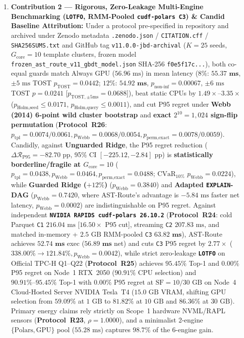 \documentclass[10pt,a4paper]{article}
\begin{document}
\begin{enumerate}[leftmargin=1.5em,itemsep=1.5pt]
    \item \textbf{Contribution 2 --- Rigorous, Zero-Leakage Multi-Engine Benchmarking (\texttt{LOTFO}, RMM-Pooled \texttt{cudf-polars C3}) \& Candid Baseline Attribution:} Under a protocol pre-specified in repository and archived under Zenodo metadata \texttt{.zenodo.json} / \texttt{CITATION.cff} / \texttt{SHA256SUMS.txt} and GitHub tag \texttt{v11.0.0-jbd-archival} ($K=25$ seeds, $G_{\text{core}}=10$ template clusters, frozen model \texttt{frozen\_ast\_route\_v11\_gbdt\_model.json} SHA-256 \texttt{f0e5f17c...}), both co-equal guards match Always GPU ($56.96\text{ ms}$) in mean latency ($8\%$: $\mathbf{55.37\text{ ms}}$, $\pm 5\text{ ms}$ TOST $p_{\text{TOST}}=0.0442$; $12\%$: $\mathbf{54.92\text{ ms}}$, $p_{\text{non-inf}}=0.00067$, $\pm 6\text{ ms}$ TOST $p=0.0241$ [$p_{\text{TOST},\pm 5\text{ms}}=0.0688$]), beat static CPUs by $1.49\times\text{--}3.35\times$ ($p_{\text{Holm,seed}}\le 0.0171$, $p_{\text{Holm,query}}\le 0.0011$), and cut P95 regret under \textbf{Webb (2014) 6-point wild cluster bootstrap} and \textbf{exact $2^{10}=1{,}024$ sign-flip permutation} (\textbf{Protocol~R26}: $p_{\text{tpl}}=0.0074/0.0061, p_{\text{Webb}}=0.0068/0.0054, p_{\text{perm,exact}}=0.0078/0.0059$). Candidly, against \textbf{Unguarded Ridge}, the P95 regret reduction ($\Delta\mathcal{R}_{\text{P95}}=-82.70\text{ pp}$, 95\% CI $[-225.12,-2.84]\text{ pp}$) is \textbf{statistically borderline/fragile at $G_{\text{core}}=10$} ($p_{\text{tpl}}=0.0438, p_{\text{Webb}}=0.0464, p_{\text{perm,exact}}=0.0488$; $\text{CVaR}_{10\%}$ $p_{\text{Webb}}=0.0224$), while \textbf{Guarded Ridge ($+12\%$)} ($p_{\text{Webb}}=0.3840$) and \textbf{Adapted \texttt{EXPLAIN}-DAG} ($p_{\text{Webb}}=0.7420$, where AST-Route's advantage is $-5.84\text{ ms}$ faster net latency, $p_{\text{Webb}}=0.0002$) are indistinguishable on P95 regret. Against independent \textbf{\texttt{NVIDIA RAPIDS cudf-polars 26.10.2}} (\textbf{Protocol~R24}: cold Parquet \texttt{C1} $216.04\text{ ms}$ [$16.50\times$ P95 cut], streaming \texttt{C2} $207.83\text{ ms}$, and matched in-memory + $2.5\text{ GB}$ RMM-pooled \texttt{C3} $\mathbf{63.82\text{ ms}}$), AST-Route achieves $\mathbf{52.74\text{ ms}}$ exec ($\mathbf{56.89\text{ ms}}$ net) and cuts \texttt{C3} P95 regret by $\mathbf{2.77\times}$ ($338.00\%\rightarrow \mathbf{121.84\%}, p_{\text{Webb}}=0.0042$), while strict zero-leakage \textbf{\texttt{LOTFO}} on Official TPC-H Q1--Q22 (\textbf{Protocol~R25}) achieves $\mathbf{95.45\%}$ Top-1 and $\mathbf{0.00\%}$ P95 regret on Node~1 RTX~2050 ($90.91\%$ CPU selection) and $\mathbf{90.91\%\text{--}95.45\%}$ Top-1 with $\mathbf{0.00\%}$ P95 regret at $\text{SF}=10/30\text{ GB}$ on Node~4 Cloud-Hosted Server NVIDIA Tesla~T4 ($15.0\text{ GB}$ VRAM, shifting GPU selection from $59.09\%$ at $1\text{ GB}$ to $81.82\%$ at $10\text{ GB}$ and $86.36\%$ at $30\text{ GB}$). Primary energy claims rely strictly on Scope~1 hardware NVML/RAPL sensors (\textbf{Protocol~R23}, $\rho=1.0000$), and a minimalist 2-engine $\{\text{Polars},\text{GPU}\}$ pool ($55.28\text{ ms}$) captures $98.7\%$ of the 6-engine gain.

\end{enumerate}
\end{document}
